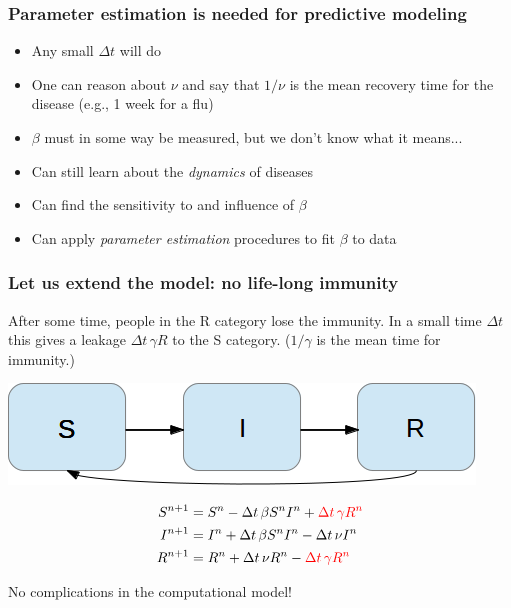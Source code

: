 \documentclass{beamer}
\newenvironment{block_mdfboxadmon}[1][]{\begin{block}{#1}}{\end{block}}
\begin{document}
\begin{frame}
\frametitle{Parameter estimation is needed for predictive modeling}

\begin{itemize}
 \item Any small $\Delta t$ will do

 \item One can reason about $\nu$ and say that $1/\nu$ is the mean
   recovery time for the disease (e.g., 1 week for a flu)

 \item $\beta$ must in some way be measured, but we don't know what it means...
\end{itemize}

\noindent

\begin{block_mdfboxadmon}
\begin{itemize}
 \item Can still learn about the \emph{dynamics} of diseases

 \item Can find the sensitivity to and influence of $\beta$

 \item Can apply \emph{parameter estimation} procedures to fit $\beta$ to data
\end{itemize}

\noindent
\end{block_mdfboxadmon}
\end{frame}

\begin{frame}
\frametitle{Let us extend the model: no life-long immunity}

\begin{block_mdfboxadmon}[Assumption.]
After some time, people in the R category lose the immunity.
In a small time $\Delta t$ this gives a leakage $\Delta t\,\gamma R$
to the S category. ($1/\gamma$ is the mean time for immunity.)
\end{block_mdfboxadmon}




\begin{center}  %
  \centerline{\includegraphics[width=0.7\linewidth]{fig/categories_SIR_feedback.png}}
\end{center}


\begin{align}
S^{n+1} &= S^n - \Delta t\,\beta S^nI^n + \color{red}{\Delta t\,\gamma R^n}
\label{SIR2:S}\\
I^{n+1} &= I^n + \Delta t\,\beta S^nI^n -\Delta t\,\nu I^n
\label{SIR2:I}\\
R^{n+1} &= R^n + \Delta t\,\nu R^n - \color{red}{\Delta t\,\gamma R^n}
\label{SIR2:R}
\end{align}

No complications in the computational model!
\end{frame}
\end{document}
